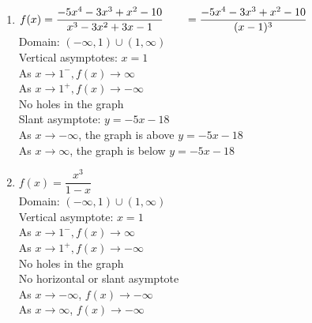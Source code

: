 \begin{multicols}{2}
\begin{enumerate}
\setcounter{enumi}{\value{HW}}

\item \small $f(x) = \dfrac{-5x^{4} - 3x^{3} + x^{2} - 10}{x^{3} - 3x^{2} + 3x - 1} \\ \phantom{f(x)} = \dfrac{-5x^{4} - 3x^{3} + x^{2} - 10}{(x-1)^3} $ \normalsize \\
Domain: $(-\infty, 1) \cup (1, \infty)$\\
Vertical asymptotes: $x = 1$\\
As $x \rightarrow 1^{-}, f(x) \rightarrow \infty$\\
As $x \rightarrow 1^{+}, f(x) \rightarrow -\infty$\\
No holes in the graph \\
Slant asymptote: $y=-5x-18$ \\
 \small  As $x \rightarrow -\infty$, the graph is above $y=-5x-18$ \normalsize\\
 \small  As $x \rightarrow \infty$, the graph is below $y=-5x-18$ \normalsize \\
 
 \vfill
 
 \columnbreak

\item $f(x) = \dfrac{x^3}{1-x}$\\
Domain: $(-\infty, 1) \cup (1, \infty)$\\
Vertical asymptote: $x=1$\\
As $x \rightarrow 1^{-}, f(x) \rightarrow \infty$\\
As $x \rightarrow 1^{+}, f(x) \rightarrow -\infty$\\
No holes in the graph \\
No horizontal or slant asymptote \\
As $x \rightarrow -\infty$, $f(x) \rightarrow -\infty$\\
As $x \rightarrow \infty$, $f(x) \rightarrow -\infty$\\


\setcounter{HW}{\value{enumi}}
\end{enumerate}
\end{multicols}


